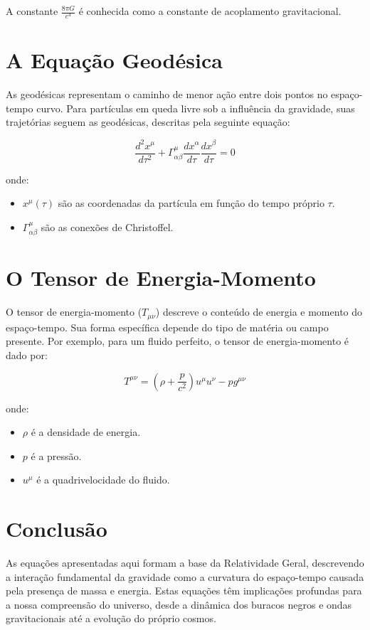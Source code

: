 \documentclass[a4paper,12pt]{article}
\begin{document}
A constante $\frac{8\pi G}{c^4}$ é conhecida como a constante de acoplamento gravitacional.

\section{A Equação Geodésica}

As geodésicas representam o caminho de menor ação entre dois pontos no espaço-tempo curvo. Para partículas em queda livre sob a influência da gravidade, suas trajetórias seguem as geodésicas, descritas pela seguinte equação:

$$\frac{d^2x^\mu}{d\tau^2} + \Gamma^\mu_{\alpha\beta} \frac{dx^\alpha}{d\tau} \frac{dx^\beta}{d\tau} = 0$$

onde:
\begin{itemize}
	\item $x^\mu(\tau)$ são as coordenadas da partícula em função do tempo próprio $\tau$.
	\item $\Gamma^\mu_{\alpha\beta}$ são as conexões de Christoffel.
\end{itemize}

\section{O Tensor de Energia-Momento}

O tensor de energia-momento ($T_{\mu\nu}$) descreve o conteúdo de energia e momento do espaço-tempo. Sua forma específica depende do tipo de matéria ou campo presente. Por exemplo, para um fluido perfeito, o tensor de energia-momento é dado por:

$$T^{\mu\nu} = (\rho + \frac{p}{c^2}) u^\mu u^\nu - p g^{\mu\nu}$$

onde:
\begin{itemize}
	\item $\rho$ é a densidade de energia.
	\item $p$ é a pressão.
	\item $u^\mu$ é a quadrivelocidade do fluido.
\end{itemize}

\section{Conclusão}

As equações apresentadas aqui formam a base da Relatividade Geral, descrevendo a interação fundamental da gravidade como a curvatura do espaço-tempo causada pela presença de massa e energia. Estas equações têm implicações profundas para a nossa compreensão do universo, desde a dinâmica dos buracos negros e ondas gravitacionais até a evolução do próprio cosmos.
\end{document}
